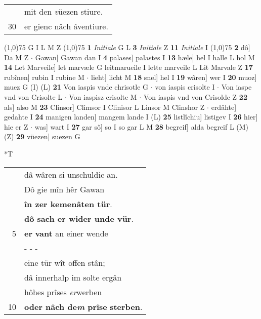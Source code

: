 \documentclass[8pt,a4paper,notitlepage]{article}
\begin{document}
\begin{table}[ht]
\begin{minipage}[t]{0.5\linewidth}
\begin{tabular}{rl}
 & mit den \textit{v}üezen stiure.\\ 
30 & er gienc nâch âventiure.\\ 
\end{tabular}
\scriptsize
\line(1,0){75} \newline
G I L M Z \newline
\line(1,0){75} \newline
\textbf{1} \textit{Initiale} G L  \textbf{3} \textit{Initiale} Z  \textbf{11} \textit{Initiale} I  \newline
\line(1,0){75} \newline
\textbf{2} dô] Da M Z  $\cdot$ Gawan] Gawan dan I \textbf{4} palases] palastes I \textbf{13} hæle] hel I halle L hol M \textbf{14} Let Marveile] let marvæle G leitmarueile I lette marveile L Lit Marvale Z \textbf{17} rubînen] rubin I rubine M  $\cdot$ lieht] licht M \textbf{18} snel] hel I \textbf{19} wâren] wer I \textbf{20} muoz] muez G (I) (L) \textbf{21} Von iaspis vnde chrisotle G  $\cdot$ von iaspis crisolte I  $\cdot$ Von iaspe vnd von Crisolte L  $\cdot$ Von iaspisz crisolte M  $\cdot$ Von iaspis vnd von Crisolde Z \textbf{22} als] also M \textbf{23} Clinsor] Climsor I Clinisor L Linsor M Clinshor Z  $\cdot$ erdâhte] gedahte I \textbf{24} manigen landen] mangem lande I (L) \textbf{25} listlîchiu] listigev I \textbf{26} hier] hie er Z  $\cdot$ was] wart I \textbf{27} gar sô] so I so gar L M \textbf{28} begreif] alda begreif L (M) (Z) \textbf{29} vüezen] suezen G \newline
\end{minipage}
\hspace{0.5cm}
\begin{minipage}[t]{0.5\linewidth}
\small
\begin{center}*T
\end{center}
\begin{tabular}{rl}
 & dâ wâren si unschuldic an.\\ 
 & Dô gie mîn hêr Gawan\\ 
 & \textbf{în zer kemenâten tür}.\\ 
 & \textbf{dô sach er wider unde vür}.\\ 
5 & \textbf{er} \textbf{vant} an einer wende\\ 
 & \multicolumn{1}{l}{ - - - }\\ 
 & eine tür wît offen stân;\\ 
 & dâ innerhalp im solte ergân\\ 
 & hôhes prîses \textit{er}werben\\ 
10 & \textbf{oder nâch de\textit{m} prîse} \textbf{sterben}.\\ 

\end{tabular}
\end{minipage}
\end{table}
\end{document}
